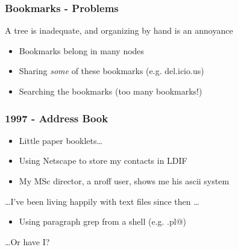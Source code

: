\documentclass{beamer}
\begin{document}
\begin{frame}[fragile]
  \frametitle{Bookmarks - Problems}

  A tree is inadequate, and organizing by hand is an annoyance

  \begin{itemize}
    \item Bookmarks belong in many nodes
    \item Sharing \textit{some} of these bookmarks (e.g. del.icio.us)
    \item Searching the bookmarks (too many bookmarks!)
  \end{itemize}


\end{frame}


\begin{frame}[fragile]
  \frametitle{1997 - Address Book}

  \begin{itemize}
    \item Little paper booklets\dots

\vfill\pause

    \item Using Netscape to store my contacts in LDIF

\vfill\pause

    \item My MSc director, a nroff user, shows me his ascii system
  \end{itemize}

\vfill\pause

  \dots I've been living happily with text files since then \dots
  \begin{itemize}
    \item Using paragraph grep from a shell (e.g. \verb@pargrep.pl@)
  \end{itemize}

\vfill\pause

  \hfill \dots Or have I? 

\end{frame}
\end{document}
